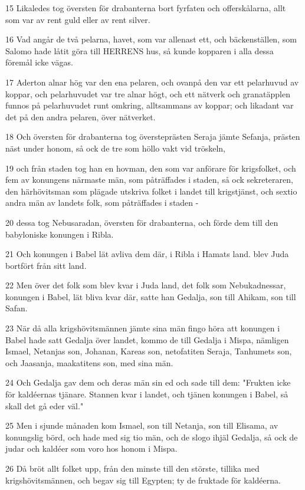\par 15 Likaledes tog översten för drabanterna bort fyrfaten och offerskålarna, allt som var av rent guld eller av rent silver.
\par 16 Vad angår de två pelarna, havet, som var allenast ett, och bäckenställen, som Salomo hade låtit göra till HERRENS hus, så kunde kopparen i alla dessa föremål icke vägas.
\par 17 Aderton alnar hög var den ena pelaren, och ovanpå den var ett pelarhuvud av koppar, och pelarhuvudet var tre alnar högt, och ett nätverk och granatäpplen funnos på pelarhuvudet runt omkring, alltsammans av koppar; och likadant var det på den andra pelaren, över nätverket.
\par 18 Och översten för drabanterna tog översteprästen Seraja jämte Sefanja, prästen näst under honom, så ock de tre som höllo vakt vid tröskeln,
\par 19 och från staden tog han en hovman, den som var anförare för krigsfolket, och fem av konungens närmaste män, som påträffades i staden, så ock sekreteraren, den härhövitsman som plägade utskriva folket i landet till krigstjänst, och sextio andra män av landets folk, som påträffades i staden -
\par 20 dessa tog Nebusaradan, översten för drabanterna, och förde dem till den babyloniske konungen i Ribla.
\par 21 Och konungen i Babel lät avliva dem där, i Ribla i Hamats land. blev Juda bortfört från sitt land.
\par 22 Men över det folk som blev kvar i Juda land, det folk som Nebukadnessar, konungen i Babel, lät bliva kvar där, satte han Gedalja, son till Ahikam, son till Safan.
\par 23 När då alla krigshövitsmännen jämte sina män fingo höra att konungen i Babel hade satt Gedalja över landet, kommo de till Gedalja i Mispa, nämligen Ismael, Netanjas son, Johanan, Kareas son, netofatiten Seraja, Tanhumets son, och Jaasanja, maakatitens son, med sina män.
\par 24 Och Gedalja gav dem och deras män sin ed och sade till dem: "Frukten icke för kaldéernas tjänare. Stannen kvar i landet, och tjänen konungen i Babel, så skall det gå eder väl."
\par 25 Men i sjunde månaden kom Ismael, son till Netanja, son till Elisama, av konungslig börd, och hade med sig tio män, och de slogo ihjäl Gedalja, så ock de judar och kaldéer som voro hos honom i Mispa.
\par 26 Då bröt allt folket upp, från den minste till den störste, tillika med krigshövitsmännen, och begav sig till Egypten; ty de fruktade för kaldéerna.
